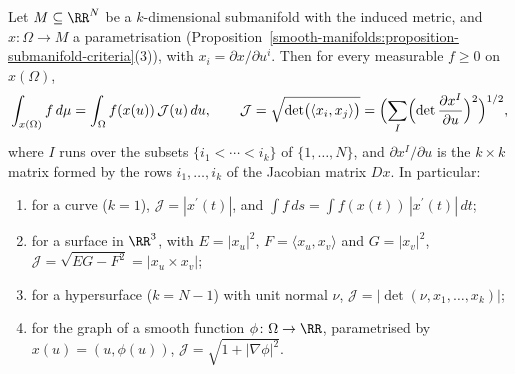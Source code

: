 \begin{proposition}\label{riemannian-geometry:proposition-parametrised-volume}
Let $M \subseteq \RR^N$ be a $k$-dimensional submanifold with the induced metric, and $x \colon \Omega \to M$ a parametrisation
(Proposition~\ref{smooth-manifolds:proposition-submanifold-criteria}(3)), with $x_i = \partial x/\partial u^i$. Then for every measurable $f \geq 0$ on $x(\Omega)$,
\[
\int_{x(\Omega)}f\,d\mu = \int_\Omega f(x(u))\,\mathcal{J}(u)\,du, \qquad
\mathcal{J} = \sqrt{\det\bigl(\langle x_i, x_j\rangle\bigr)} = \Bigl(\sum_I\Bigl(\det\frac{\partial x^I}{\partial u}\Bigr)^2\Bigr)^{1/2},
\]
where $I$ runs over the subsets $\{i_1 < \cdots < i_k\}$ of $\{1, \ldots, N\}$, and $\partial x^I/\partial u$ is the $k \times k$ matrix formed by the rows
$i_1, \ldots, i_k$ of the Jacobian matrix $Dx$. In particular:
\begin{enumerate}
\item for a curve ($k = 1$), $\mathcal{J} = |x^{\prime}(t)|$, and $\int f\,ds = \int f(x(t))\,|x^{\prime}(t)|\,dt$;
\item for a surface in $\RR^3$, with $E = |x_u|^2$, $F = \langle x_u, x_v\rangle$ and $G = |x_v|^2$, $\mathcal{J} = \sqrt{EG - F^2} = |x_u \times x_v|$;
\item for a hypersurface ($k = N - 1$) with unit normal $\nu$, $\mathcal{J} = |\det(\nu, x_1, \ldots, x_k)|$;
\item for the graph of a smooth function $\phi \colon \Omega \to \RR$, parametrised by $x(u) = (u, \phi(u))$, $\mathcal{J} = \sqrt{1 + |\nabla\phi|^2}$.
\end{enumerate}
\end{proposition}

